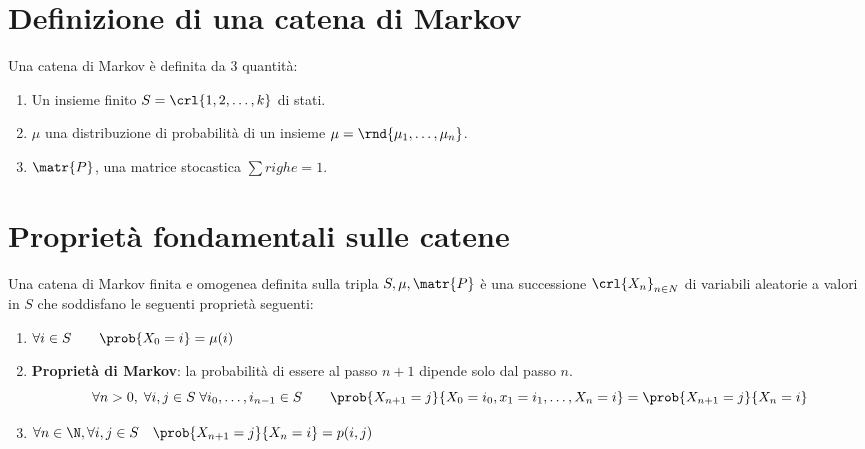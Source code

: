 \documentclass[\main/main.tex]{subfiles}
\begin{document}
\section{Definizione di una catena di Markov}
Una catena di Markov è definita da 3 quantità:
\begin{enumerate}
  \item Un insieme finito \(S = \crl{1, 2, \ldots, k}\) di stati.
  \item \(\mu \) una distribuzione di probabilità di un insieme \(\mu = \rnd{\mu_1, \ldots, \mu_n}\).
  \item \(\matr{P}\), una matrice stocastica \(\sum righe =1\).
\end{enumerate}
\section{Proprietà fondamentali sulle catene}
Una catena di Markov finita e omogenea definita sulla tripla \(S, \mu, \matr{P}\) è una successione \(\crl{X_n}_{n \in N}\) di variabili aleatorie a valori in \(S\) che soddisfano le seguenti proprietà seguenti:
\begin{enumerate}
  \item \(\forall i \in S \qquad \prob{X_0 = i} = \mu(i)\)
  \item \textbf{Proprietà di Markov}: la probabilità di essere al passo \(n+1\) dipende solo dal passo \(n\).
        \[
          \forall n > 0,\; \forall i,j \in S \; \forall i_0, \ldots, i_{n-1} \in S \qquad \prob{X_{n+1} = j}{X_0=i_0, x_1 = i_1, \ldots, X_n=i} = \prob{X_{n+1} = j}{X_n = i}
        \]
  \item \(\forall n \in \N, \forall i,j \in S \quad \prob{X_{n+1} = j}{X_n = i} = p(i,j)\)
\end{enumerate}
\end{document}
